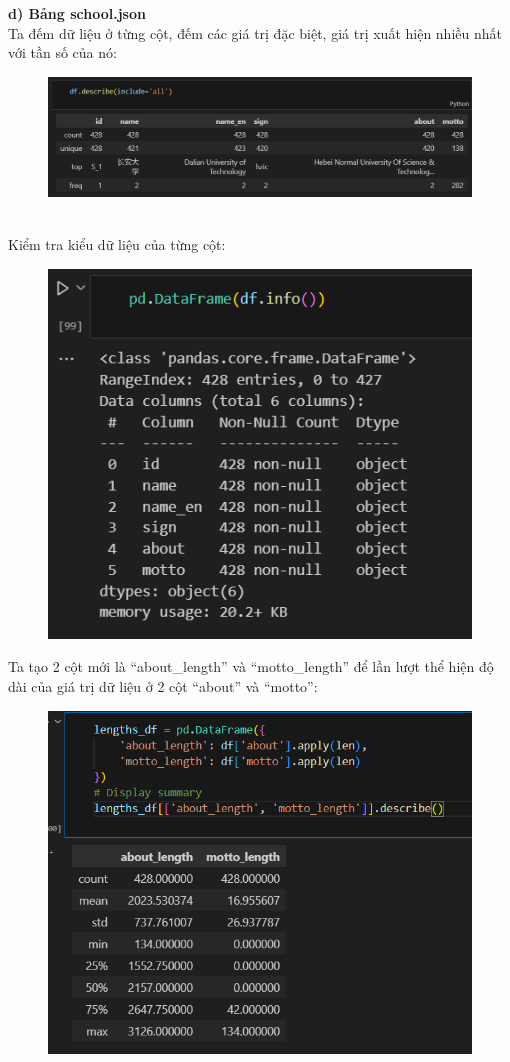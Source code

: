 \textbf{d) Bảng school.json}\\
Ta đếm dữ liệu ở từng cột, đếm các giá trị đặc biệt, giá trị xuất hiện nhiều nhất với tần số của nó:
\begin{figure}[h]
    \centering
    \includegraphics[width=0.75\linewidth]{figures/34.png}
\end{figure}\\
Kiểm tra kiểu dữ liệu của từng cột: 
\newpage
\begin{figure}
    \centering
    \includegraphics[width=0.6\linewidth]{figures/35.png}
\end{figure}
Ta tạo 2 cột mới là “about\_length” và “motto\_length” để lần lượt thể hiện độ dài của giá trị dữ liệu ở 2 cột “about” và “motto”:
\begin{figure}[h]
    \centering
    \includegraphics[width=0.65\linewidth]{figures/36.png}
\end{figure}

